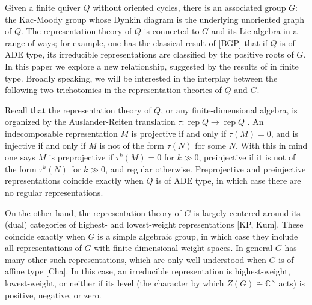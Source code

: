 \documentclass[12pt]{amsart}
\newcommand{\sayDR}[1]{\say[DR]{\color{red}{\bf DR:}\;#1}}
\newcommand{\CC}{\mathbb{C}}
\newcommand{\rep}{\operatorname{rep}}
\theoremstyle{remark}
\numberwithin{equation}{section}
\begin{document}
Given a finite quiver $Q$ without oriented cycles, there is an associated group $G$: the Kac-Moody group whose Dynkin diagram is the underlying unoriented graph of $Q$. The representation theory of $Q$ is connected to $G$ and its Lie algebra in a range of ways; for example, one has the classical result of [BGP] that if $Q$ is of ADE type, its irreducible representations are classified by the positive roots of $G$. In this paper we explore a new relationship, suggested by the results of \cite{YZ08} in finite type. Broadly speaking, we will be interested in the interplay between the following two trichotomies in the representation theories of $Q$ and $G$.


Recall that the representation theory of $Q$, or any finite-dimensional algebra, is organized by the Auslander-Reiten translation $\tau: \rep Q \to \rep Q$ \cite{ASS06}\sayDR{Why is this not showing up as [ASS06]?}. An indecomposable representation $M$ is projective if and only if $\tau(M) = 0$, and is injective if and only if $M$ is not of the form $\tau(N)$ for some $N$. With this in mind one says $M$ is preprojective if $\tau^k(M) = 0$ for $k\gg 0$, preinjective if it is not of the form $\tau^k(N)$ for $k\gg 0$, and regular otherwise. Preprojective and preinjective representations coincide exactly when $Q$ is of ADE type, in which case there are no regular representations. 

On the other hand, the representation theory of $G$ is largely centered around its (dual) categories of highest- and lowest-weight representations [KP, Kum]. These coincide exactly when $G$ is a simple algebraic group, in which case they include all representations of $G$ with finite-dimensional weight spaces. In general $G$ has many other such representations, which are only well-understood when $G$ is of affine type [Cha]. In this case, an irreducible representation is highest-weight, lowest-weight, or neither if its level (the character by which $Z(G) \cong \CC^\times$ acts) is positive, negative, or zero.

\end{document}
